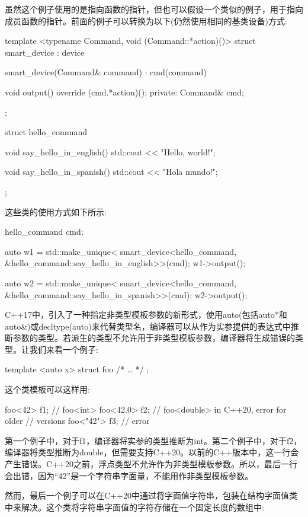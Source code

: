 虽然这个例子使用的是指向函数的指针，但也可以假设一个类似的例子，用于指向成员函数的指针。前面的例子可以转换为以下(仍然使用相同的基类设备)方式:

\begin{cpp}
template <typename Command, void (Command::*action)()>
struct smart_device : device
{
	smart_device(Command& command) : cmd(command) {}
	
	void output() override
	{
		(cmd.*action)();
	}
private:
	Command& cmd;
};

struct hello_command
{
	void say_hello_in_english()
	{
		std::cout << "Hello, world!\n";
	}

	void say_hello_in_spanish()
	{
		std::cout << "Hola mundo!\n";
	}
};
\end{cpp}

这些类的使用方式如下所示:

\begin{cpp}
hello_command cmd;

auto w1 = std::make_unique<
	smart_device<hello_command,
		&hello_command::say_hello_in_english>>(cmd);
w1->output();

auto w2 = std::make_unique<
	smart_device<hello_command,
		&hello_command::say_hello_in_spanish>>(cmd);
w2->output();
\end{cpp}

C++17中，引入了一种指定非类型模板参数的新形式，使用auto(包括auto*和auto\&)或decltype(auto)来代替类型名，编译器可以从作为实参提供的表达式中推断参数的类型。若派生的类型不允许用于非类型模板参数，编译器将生成错误的类型。让我们来看一个例子:

\begin{cpp}
template <auto x>
struct foo
{ /* … */ };
\end{cpp}

这个类模板可以这样用:

\begin{cpp}
foo<42> f1;   // foo<int>
foo<42.0> f2; // foo<double> in C++20, error for older
              // versions
foo<"42"> f3; // error
\end{cpp}

第一个例子中，对于f1，编译器将实参的类型推断为int。第二个例子中，对于f2，编译器将类型推断为double，但需要支持C++20。以前的C++版本中，这一行会产生错误。C++20之前，浮点类型不允许作为非类型模板参数。所以，最后一行会出错，因为“42”是一个字符串字面量，不能用作非类型模板参数。

然而，最后一个例子可以在C++20中通过将字面值字符串，包装在结构字面值类中来解决。这个类将字符串字面值的字符存储在一个固定长度的数组中:

